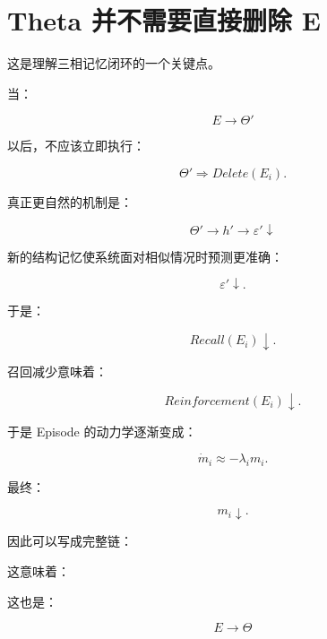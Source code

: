 \begin{statementbox}
\centering
{}
\end{statementbox}


\section{Theta 并不需要直接删除 E}

这是理解三相记忆闭环的一个关键点。

当：

\[
E
\rightarrow
\Theta'
\]

以后，不应该立即执行：

\[
\Theta'\Rightarrow Delete(E_i).
\]

真正更自然的机制是：

\[
\boxed{
\Theta'
\rightarrow
h'
\rightarrow
\varepsilon'\downarrow
}
\]

新的结构记忆使系统面对相似情况时预测更准确：

\[
\varepsilon'\downarrow.
\]

于是：

\[
Recall(E_i)\downarrow.
\]

召回减少意味着：

\[
Reinforcement(E_i)\downarrow.
\]

于是 Episode 的动力学逐渐变成：

\[
\dot m_i
\approx
-\lambda_im_i.
\]

最终：

\[
m_i\downarrow.
\]

因此可以写成完整链：

\begin{statementbox}
\centering
{}
\end{statementbox}

这意味着：

\begin{statementbox}
\centering
{}
\end{statementbox}

这也是：

\[
\boxed{
E\rightarrow\Theta
}
\]

